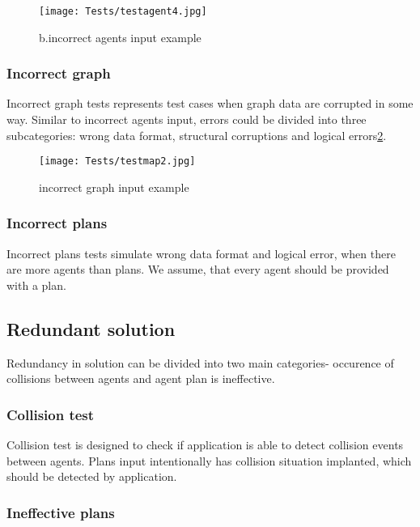 \documentclass[thesis=B,english]{FITthesis}[2019/12/23]
\begin{document}
\begin{figure}
	\texttt{[image: Tests/testagent4.jpg]}
	\caption[b.incorrect agents input example]{b.incorrect agents input example}\label{fig:float11}
\end{figure}


\subsubsection{Incorrect graph}

Incorrect graph tests represents test cases when graph data are corrupted in some way. Similar to incorrect agents input, errors could be divided into three subcategories: wrong data format, structural corruptions and logical errors\ref{fig:float12}. 

\begin{figure}
	\texttt{[image: Tests/testmap2.jpg]}
	\caption[incorrect graph input example]{incorrect graph input example}\label{fig:float12}
\end{figure}


\subsubsection{Incorrect plans}

Incorrect plans tests simulate wrong data format and logical error, when there are more agents than plans. We assume, that every agent should be provided with a plan.

\subsection{Redundant solution}

Redundancy in solution can be divided into two main categories- occurence of collisions between agents and agent plan is ineffective.  

\subsubsection{Collision test}

Collision test is designed to check if application is able to detect collision events between agents. Plans input intentionally has collision situation implanted, which should be detected by application.

\subsubsection{Ineffective plans} 
\end{document}
